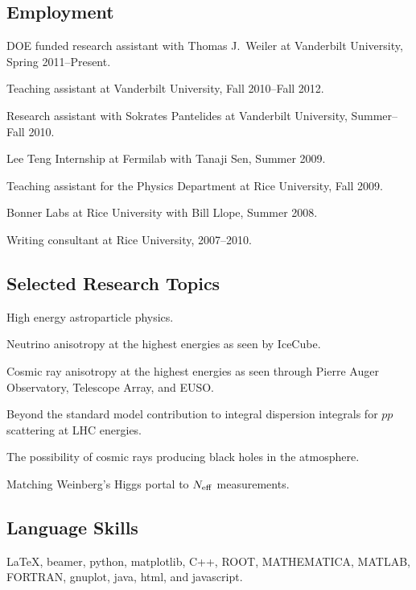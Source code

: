 \documentclass[letterpaper]{article}
\renewenvironment{itemize}{
\begin{list}{}{
\setlength{\leftmargin}{1.5em}
}
}{
\end{list}
}
\begin{document}
\subsection*{Employment}
\begin{itemize}
\item DOE funded research assistant with Thomas J.~Weiler at Vanderbilt University, Spring 2011--Present.
\item Teaching assistant at Vanderbilt University, Fall 2010--Fall 2012.
\item Research assistant with Sokrates Pantelides at Vanderbilt University, Summer--Fall 2010.
\item Lee Teng Internship at Fermilab with Tanaji Sen, Summer 2009.
\item Teaching assistant for the Physics Department at Rice University, Fall 2009.
\item Bonner Labs at Rice University with Bill Llope, Summer 2008.
\item Writing consultant at Rice University, 2007--2010.
\end{itemize}

\subsection*{Selected Research Topics}
\begin{itemize}
\item High energy astroparticle physics.
\item Neutrino anisotropy at the highest energies as seen by IceCube.
\item Cosmic ray anisotropy at the highest energies as seen through Pierre Auger Observatory, Telescope Array, and EUSO.
\item Beyond the standard model contribution to integral dispersion integrals for $pp$ scattering at LHC energies.
\item The possibility of cosmic rays producing black holes in the atmosphere.
\item Matching Weinberg's Higgs portal to $N_{\rm{eff}}$ measurements.
\end{itemize}

\subsection*{Language Skills}
\begin{itemize}
\item 
\LaTeX, beamer, python, matplotlib, C++, ROOT, MATHEMATICA, MATLAB, FORTRAN, gnuplot, java, html, and javascript.
\end{itemize}
\end{document}
